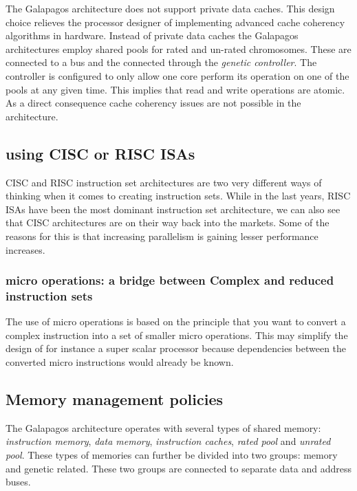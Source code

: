 The Galapagos architecture does not support private data caches. This design choice relieves the processor designer of implementing advanced cache coherency algorithms in hardware. Instead of private data caches the Galapagos architectures employ shared pools for rated and un-rated chromosomes. These are connected to a bus and the connected through the \emph{genetic controller}. The controller is configured to only allow one core perform its operation on one of the pools at any given time. This implies that read and write operations are atomic. As a direct consequence cache coherency issues are not possible in the architecture. 




\subsection{using CISC or RISC ISAs}
CISC and RISC instruction set architectures are two very different ways of thinking when it comes to creating instruction sets.
While in the last years, RISC ISAs have been the most dominant instruction set architecture, we can also see that CISC architectures
are on their way back into the markets. Some of the reasons for this is that increasing parallelism is gaining lesser performance increases.

\subsubsection{micro operations: a bridge between Complex and reduced instruction sets}
The use of micro operations is based on the principle that you want to convert a complex instruction into a set of smaller micro operations. This
may simplify the design of for instance a super scalar processor because dependencies between the converted micro instructions would already be known. 

\subsection{Memory management policies}
The Galapagos architecture operates with several types of shared memory: \emph{instruction memory}, \emph{data memory}, \emph{instruction caches}, \emph{rated pool} and \emph{unrated pool}. These types of memories  can further be divided into two groups: memory and genetic related. These two groups are connected to separate data and address buses.  


\section{}
